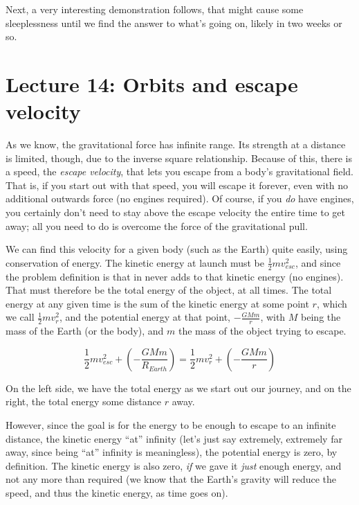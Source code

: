 \documentclass[8.01x]{subfiles}
\begin{document}
Next, a very interesting demonstration follows, that might cause some sleeplessness until we find the answer to what's going on, likely in two weeks or so.

\section{Lecture 14: Orbits and escape velocity}

As we know, the gravitational force has infinite range. Its strength at a distance is limited, though, due to the inverse square relationship. Because of this, there is a speed, the \emph{escape velocity}, that lets you escape from a body's gravitational field. That is, if you start out with that speed, you will escape it forever, even with no additional outwards force (no engines required). Of course, if you \emph{do} have engines, you certainly don't need to stay above the escape velocity the entire time to get away; all you need to do is overcome the force of the gravitational pull.

We can find this velocity for a given body (such as the Earth) quite easily, using conservation of energy. The kinetic energy at launch must be $\displaystyle \frac{1}{2} m v_{esc}^2$, and since the problem definition is that in never adds to that kinetic energy (no engines). That must therefore be the total energy of the object, at all times. The total energy at any given time is the sum of the kinetic energy at some point $r$, which we call $\displaystyle \frac{1}{2} m v_r^2$, and the potential energy at that point, $\displaystyle - \frac{G M m}{r}$, with $M$ being the mass of the Earth (or the body), and $m$ the mass of the object trying to escape.

\begin{equation}
\frac{1}{2} m v_{esc}^2 + \left(-\frac{G M m}{R_{Earth}}\right) = \frac{1}{2} m v_r^2 + \left(-\frac{G M m}{r}\right)
\end{equation}

On the left side, we have the total energy as we start out our journey, and on the right, the total energy some distance $r$ away.

However, since the goal is for the energy to be enough to escape to an infinite distance, the kinetic energy ``at'' infinity (let's just say extremely, extremely far away, since being ``at'' infinity is meaningless), the potential energy is zero, by definition. The kinetic energy is also zero, \emph{if} we gave it \emph{just} enough energy, and not any more than required (we know that the Earth's gravity will reduce the speed, and thus the kinetic energy, as time goes on).
\end{document}

